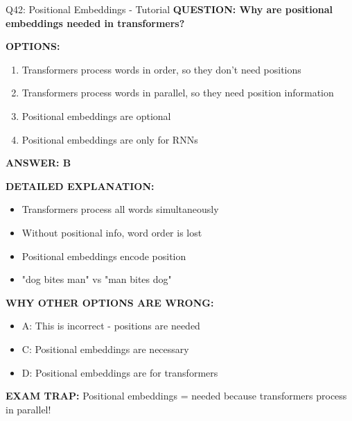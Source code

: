 \documentclass[8pt]{beamer}
\begin{document}
	\begin{frame}{Q42: Positional Embeddings - Tutorial}
		\fontsize{6.5}{7.5}\selectfont
		\textbf{QUESTION: Why are positional embeddings needed in transformers?}
		
		\vspace{0.1cm}
		\textbf{OPTIONS:}
		\begin{enumerate}
			\item Transformers process words in order, so they don't need positions
			\item Transformers process words in parallel, so they need position information
			\item Positional embeddings are optional
			\item Positional embeddings are only for RNNs
		\end{enumerate}
		
		\vspace{0.1cm}
		\textcolor{myblue}{\textbf{ANSWER: B}}
		
		\vspace{0.1cm}
		\textbf{DETAILED EXPLANATION:}
		\begin{itemize}
			\item Transformers process all words simultaneously
			\item Without positional info, word order is lost
			\item Positional embeddings encode position
			\item "dog bites man" vs "man bites dog"
		\end{itemize}
		
		\vspace{0.1cm}
		\textcolor{myred}{\textbf{WHY OTHER OPTIONS ARE WRONG:}}
		\begin{itemize}
			\item \textcolor{myred}{A:} This is incorrect - positions are needed
			\item \textcolor{myred}{C:} Positional embeddings are necessary
			\item \textcolor{myred}{D:} Positional embeddings are for transformers
		\end{itemize}
		
		\textcolor{myred}{\textbf{EXAM TRAP:}} Positional embeddings = \textcolor{myblue}{needed because transformers process in parallel}!
	\end{frame}
	
\end{document}
